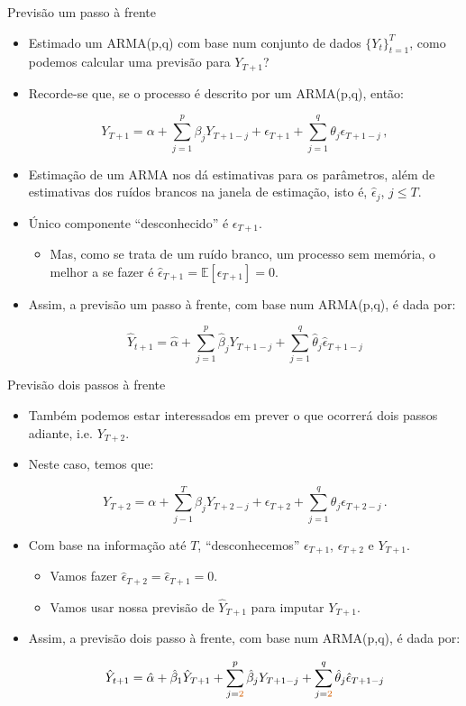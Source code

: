 \documentclass[11pt]{beamer}
\begin{document}
\begin{frame}{Previsão um passo à frente}
	\begin{itemize}
		\item Estimado um ARMA(p,q) com base num conjunto de dados $\{Y_t\}_{t=1}^T$, como podemos calcular uma previsão para $Y_{T+1}$?
		\item Recorde-se que, se o processo é descrito por um ARMA(p,q), então:
		
		$$Y_{T+1} = \alpha + \sum_{j=1}^{p} \beta_j Y_{T+1-j} + \epsilon_{T+1} + \sum_{j=1}^q \theta_j \epsilon_{T+1-j} \, ,  $$
		
		\item Estimação de um ARMA nos dá estimativas para os parâmetros, além de estimativas dos ruídos brancos na janela de estimação, isto é, $\hat \epsilon_{j}$, $j \leq T$.
		\item Único componente ``desconhecido'' é $\epsilon_{T+1}$.
		\begin{itemize}
				\item Mas, como se trata de um ruído branco, um processo sem memória, o melhor a se fazer é $\hat \epsilon_{T+1} = \mathbb{E}[\epsilon_{T+1}] = 0$.
		\end{itemize}
		\item Assim, {\color{blue}a previsão um passo à frente}, com base num ARMA(p,q), é dada por:
		
		$$\hat Y_{t+1} = \hat \alpha + \sum_{j=1}^p \hat{\beta}_j Y_{T+1-j} + \sum_{j=1}^q \hat \theta_j \hat \epsilon_{T+1-j}$$
	
	\end{itemize}
\end{frame}

\begin{frame}{Previsão dois passos à frente}
	\begin{itemize}
		\item Também podemos estar interessados em prever o que ocorrerá dois passos adiante, i.e. $Y_{T+2}$.
		\item Neste caso, temos que:
		
		$$Y_{T+2} = \alpha + \sum_{j-1}^T \beta_{j} 	Y_{T+2-j} + \epsilon_{T+2} + \sum_{j=1}^q \theta_j \epsilon_{T+2-j}\, .$$
		
		\item Com base na informação até $T$, ``desconhecemos'' $\epsilon_{T+1}$, $\epsilon_{T+2}$ e $Y_{T+1}$.
		\begin{itemize}
			\item Vamos fazer $\hat \epsilon_{T+2} = \hat \epsilon_{T+1} = 0$.
			\item Vamos usar nossa previsão de $\hat{Y}_{T+1}$ para imputar $Y_{T+1}$.
		\end{itemize}
			\item Assim, {\color{blue}a previsão dois passo à frente}, com base num ARMA(p,q), é dada por:
		
		$$\hat Y_{t+1} = \hat \alpha + \hat \beta_1 \hat Y_{T+1} + \sum_{j={\color{red}2}}^p \hat{\beta}_j Y_{T+1-j} + \sum_{j={\color{red}2}}^q \hat \theta_j \hat\epsilon_{T+1-j}$$
	\end{itemize}
\end{frame}
\end{document}

